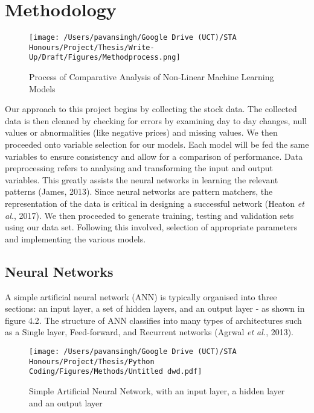 
\chapter{Methodology} %

\label{Chapter4} %

\begin{figure}[h]
\centering
  \texttt{[image: /Users/pavansingh/Google Drive (UCT)/STA Honours/Project/Thesis/Write-Up/Draft/Figures/Methodprocess.png]}
  \caption{Process of Comparative Analysis of Non-Linear Machine Learning Models}
  \label{}
\end{figure}


Our approach to this project begins by collecting the stock data. The collected data is then cleaned by checking for errors by examining day to day changes, null values or abnormalities (like negative prices) and missing values. We then proceeded onto variable selection for our models. Each model will be fed the same variables to ensure consistency and allow for a comparison of performance. Data preprocessing refers to analysing and transforming the input and output variables. This greatly assists the neural networks in learning the relevant patterns  (James, 2013). Since neural networks are pattern matchers, the representation of the data is critical in designing a successful network (Heaton \textit{et al.}, 2017). We then proceeded to generate training, testing and validation sets using our data set. Following this involved, selection of appropriate parameters and implementing the various models. 

\section{Neural Networks}

A simple artificial neural network (ANN) is typically organised into three sections: an input layer, a set of hidden layers, and an output layer - as shown in figure 4.2. The structure of ANN classifies into many types of architectures such as a Single layer, Feed-forward, and Recurrent networks (Agrwal \textit{et al.}, 2013). 

\begin{figure}[h]
\centering
  \texttt{[image: /Users/pavansingh/Google Drive (UCT)/STA Honours/Project/Thesis/Python Coding/Figures/Methods/Untitled dwd.pdf]}
  \caption{Simple Artificial Neural Network, with an input layer, a hidden layer and an output layer}
  \label{}
\end{figure}

